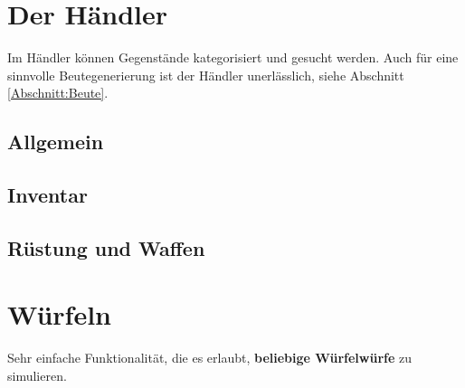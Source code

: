 \documentclass[11pt, a4paper, german]{article}
\begin{document}
\section{Der Händler}\label{Abschnitt:Haendler}
Im Händler können Gegenstände kategorisiert und gesucht werden. Auch für eine sinnvolle Beutegenerierung ist der Händler unerlässlich, siehe Abschnitt \ref{Abschnitt:Beute}.
\subsection{Allgemein}
\subsection{Inventar}
\subsection{Rüstung und Waffen}

\section{Würfeln}
Sehr einfache Funktionalität, die es erlaubt, \textbf{beliebige Würfelwürfe} zu simulieren.
\end{document}
